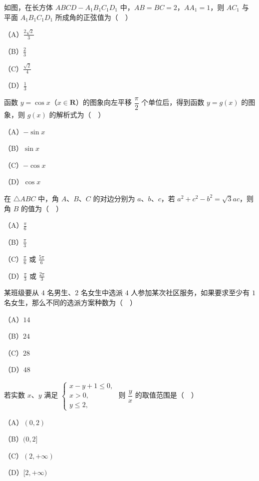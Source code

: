 \begin{question}
如图，在长方体 $ABCD-A_1B_1C_1D_1$ 中，$AB=BC=2$，$AA_1=1$，则 $AC_1$ 与平面 $A_1B_1C_1D_1$ 所成角的正弦值为（　）

（A）$\frac{2\sqrt2}{3}$

（B）$\frac23$

（C）$\frac{\sqrt2}{4}$

（D）$\frac13$
\nopagebreak[4]
\begin{center}\end{center}
\nopagebreak[4]
\end{question}
\begin{question}
函数 $y=\cos x$（$x\in\mathbf R$）的图象向左平移 $\dfrac{\pi}{2}$ 个单位后，得到函数 $y=g(x)$ 的图象，则 $g(x)$ 的解析式为（　）

（A）$-\sin x$

（B）$\sin x$

（C）$-\cos x$

（D）$\cos x$

\end{question}
\begin{question}
在 $\triangle ABC$ 中，角 $A$、$B$、$C$ 的对边分别为 $a$、$b$、$c$，若 $a^2+c^2-b^2=\sqrt3ac$，则角 $B$ 的值为（　）

（A）$\frac{\pi}{6}$

（B）$\frac{\pi}{3}$

（C）$\frac{\pi}{6}$ 或 $\frac{5\pi}{6}$

（D）$\frac{\pi}{3}$ 或 $\frac{2\pi}{3}$

\end{question}
\begin{question}
某班级要从 $4$ 名男生、$2$ 名女生中选派 $4$ 人参加某次社区服务，如果要求至少有 $1$ 名女生，那么不同的选派方案种数为（　）

（A）$14$

（B）$24$

（C）$28$

（D）$48$

\end{question}
\begin{question}
若实数 $x$、$y$ 满足 $\begin{cases}x-y+1\leqslant0,\\ x>0,\\ y\leqslant2,\end{cases}$ 则 $\dfrac yx$ 的取值范围是（　）

（A）$(0,2)$

（B）$(0,2]$

（C）$(2,+\infty)$

（D）$[2,+\infty)$

\Needspace{0.4\textheight}
\end{question}
